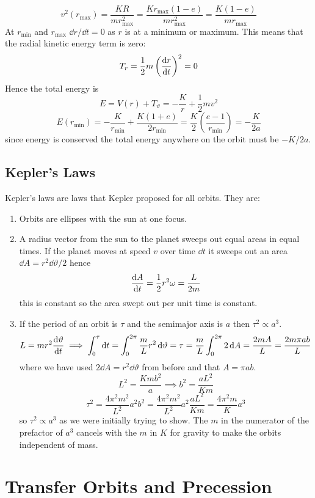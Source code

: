 \documentclass{article}
\begin{document}
    \[v^2(r_\text{max}) = \frac{KR}{mr_\text{max}^2} = \frac{Kr_\text{max}(1 - e)}{mr_\text{max}^2} = \frac{K(1 - e)}{mr_\text{max}}\]
    At \(r_\text{min}\) and \(r_\text{max}\) \(\dd r/\dd t = 0\) as \(r\) is at a minimum or maximum.
    This means that the radial kinetic energy term is zero:
    \[T_r = \frac{1}{2}m\left(\dv{r}{t}\right)^2 = 0\]
    Hence the total energy is
    \[E = V(r) + T_\vartheta = -\frac{K}{r} + \frac{1}{2}mv^2\]
    \[E(r_\text{min}) = -\frac{K}{r_\text{min}} + \frac{K(1 + e)}{2r_\text{min}} = \frac{K}{2}\left(\frac{e - 1}{r_\text{min}}\right) = -\frac{K}{2a}\]
    since energy is conserved the total energy anywhere on the orbit must be \(-K/2a\).
    
    \subsection{Kepler's Laws}
    Kepler's laws are laws that Kepler proposed for all orbits.
    They are:
    \begin{enumerate}
        \item Orbits are ellipses with the sun at one focus.
        \item A radius vector from the sun to the planet sweeps out equal areas in equal times.
        If the planet moves at speed \(v\) over time \(\dd t\) it sweeps out an area \(\dd A = r^2\dd\vartheta/2\) hence
        \[\dv{A}{t} = \frac{1}{2}r^2\omega = \frac{L}{2m}\]
        this is constant so the area swept out per unit time is constant.
        \item If the period of an orbit is \(\tau\) and the semimajor axis is \(a\) then \(\tau^2\propto a^3\).
        \[L = mr^2\dv{\vartheta}{t}\implies \int_0^\tau\dd t = \int_0^{2\pi}\frac{m}{L}r^2\,\dd\vartheta = \tau = \frac{m}{L}\int_0^{2\pi}2\,\dd A = \frac{2mA}{L} = \frac{2m\pi ab}{L}\]
        where we have used \(2\dd A = r^2\dd\vartheta\) from before and that \(A = \pi ab\).
        \[L^2 = \frac{Kmb^2}{a}\implies b^2 = \frac{aL^2}{Km}\]
        \[\tau^2 = \frac{4\pi^2m^2}{L^2}a^2b^2 = \frac{4\pi^2m^2}{L^2}a^2\frac{aL^2}{Km} = \frac{4\pi^2m}{K}a^3\]
        so \(\tau^2 \propto a^3\) as we were initially trying to show.
        The \(m\) in the numerator of the prefactor of \(a^3\) cancels with the \(m\) in \(K\) for gravity to make the orbits independent of mass.
    \end{enumerate}
    
    \section{Transfer Orbits and Precession}
\end{document}
